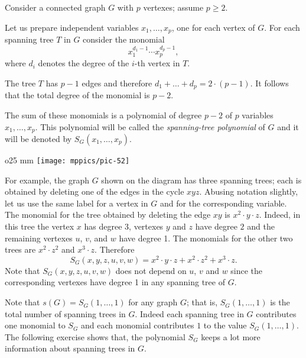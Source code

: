 Consider a connected graph $G$ with $p$ vertexes;
assume $p\ge 2$.

Let us prepare independent variables $x_1,\dots,x_p$, one for each vertex of $G$.
For each spanning tree $T$ in $G$ consider the monomial 
\[x_1^{d_1-1}\cdots x_p^{d_p-1},\]
where $d_i$ denotes the degree of the $i$-th vertex in $T$.

The tree $T$ has $p-1$ edges and therefore 
$d_1+\dots+d_p=2\cdot(p-1)$.
It follows that the total degree of the monomial is $p-2$.

The sum of these monomials is a polynomial of degree $p-2$ of $p$ variables $x_1,\dots, x_p$.
This polynomial will be called the \emph{spanning-tree polynomial} of $G$ and it will be denoted by 
$S_G(x_1,\dots,x_p)$.

\begin{wrapfigure}{o}{25 mm}
\vskip-0mm
\centering
\texttt{[image: mppics/pic-52]}
\vskip-0mm
\end{wrapfigure}

For example, the graph $G$ shown on the diagram has three spanning trees; each is obtained by deleting one of the edges in the cycle $xyz$.
Abusing notation slightly, let us use the same label for a vertex in $G$ and for the corresponding variable.
The monomial for the tree obtained by deleting the edge $xy$ is $x^2\cdot y\cdot z$.
Indeed, in this tree the vertex $x$ has degree 3, vertexes $y$ and $z$ have degree $2$ and the remaining vertexes $u$, $v$, and $w$ have degree 1.
The monomials for the other two trees are $x^2\cdot z^2$ and $x^3\cdot z$.
Therefore 
\[S_G(x,y,z,u,v,w)= x^2\cdot y\cdot z+x^2\cdot z^2+x^3\cdot z.\]
Note that $S_G(x,y,z,u,v,w)$ does not depend on $u$, $v$ and $w$ since the corresponding vertexes have degree 1 in any spanning tree of $G$.


Note that $s(G)=S_G(1,\dots,1)$ for any graph $G$; that is, $S_G(1,\dots,1)$ is the total number of spanning trees in $G$.
Indeed each spanning tree in $G$ contributes one monomial to $S_G$ and each monomial contributes $1$ to the value $S_G(1,\dots,1)$.
The following exercise shows that,
the polynomial $S_G$ keeps a lot more information about spanning trees in $G$.   

